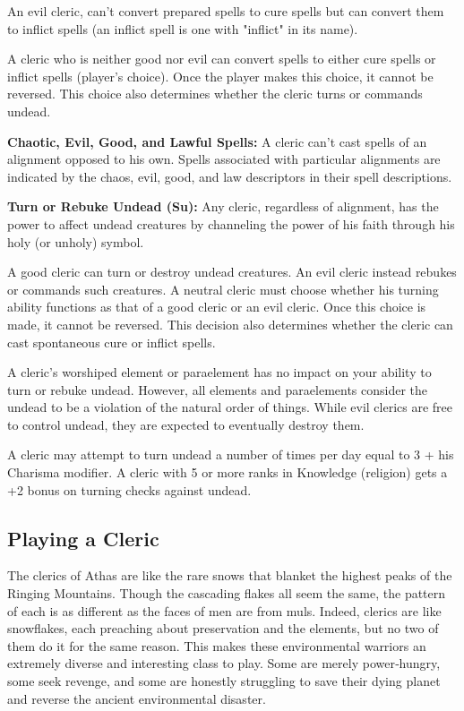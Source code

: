 \documentclass[10pt,a4paper,twocolumn]{d20}
\begin{document}
{An evil cleric, can’t convert prepared spells to cure spells but can convert them to inflict spells (an inflict spell is one with "inflict" in its name).

A cleric who is neither good nor evil can convert spells to either cure spells or inflict spells (player’s choice). Once the player makes this choice, it cannot be reversed. This choice also determines whether the cleric turns or commands undead.

\textbf{Chaotic, Evil, Good, and Lawful Spells:} A cleric can’t cast spells of an alignment opposed to his own. Spells associated with particular alignments are indicated by the chaos, evil, good, and law descriptors in their spell descriptions.

\textbf{Turn or Rebuke Undead (Su):} Any cleric, regardless of alignment, has the power to affect undead creatures by channeling the power of his faith through his holy (or unholy) symbol. 

A good cleric can turn or destroy undead creatures. An evil cleric instead rebukes or commands such creatures. A neutral cleric must choose whether his turning ability functions as that of a good cleric or an evil cleric. Once this choice is made, it cannot be reversed. This decision also determines whether the cleric can cast spontaneous cure or inflict spells.

A cleric’s worshiped element or paraelement has no impact on your ability to turn or rebuke undead. However, all elements and paraelements consider the undead to be a violation of the natural order of things. While evil clerics are free to control undead, they are expected to eventually destroy them.

A cleric may attempt to turn undead a number of times per day equal to 3 + his Charisma modifier. A cleric with 5 or more ranks in Knowledge (religion) gets a +2 bonus on turning checks against undead.

\subsection{Playing a Cleric}

The clerics of Athas are like the rare snows that blanket the highest peaks of the Ringing Mountains. Though the cascading flakes all seem the same, the pattern of each is as different as the faces of men are from muls. Indeed, clerics are like snowflakes, each preaching about preservation and the elements, but no two of them do it for the same reason. This makes these environmental warriors an extremely diverse and interesting class to play. Some are merely power‐hungry, some seek revenge, and some are honestly struggling to save their dying planet and reverse the ancient environmental disaster.

}
\end{document}
